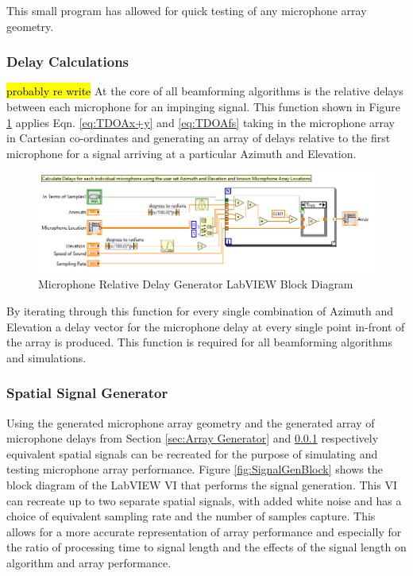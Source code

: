 \documentclass{UoNMCHA}
\numberwithin{equation}{section}
\begin{document}
    This small program has allowed for quick testing of any microphone array geometry.
\subsubsection{Delay Calculations} \label{sec:Delay Calculations}
    \hl{probably re write}
    At the core of all beamforming algorithms is the relative delays between each microphone for an impinging signal. This function shown in Figure \ref{fig:MicDelayBlock} applies Eqn. \ref{eq:TDOAx+y} and \ref{eq:TDOAfs} taking in the microphone array in Cartesian co-ordinates and generating an array of delays relative to the first microphone for a signal arriving at a particular Azimuth and Elevation.
    
    \begin{figure}[H]
        \centering
        \includegraphics[keepaspectratio, width = \textwidth]{Figures/DelayCalcBlock.png}
        \caption{Microphone Relative Delay Generator LabVIEW Block Diagram}
        \label{fig:MicDelayBlock}
    \end{figure}    
    
    By iterating through this function for every single combination of Azimuth and Elevation a delay vector for the microphone delay at every single point in-front of the array is produced. This function is required for all beamforming algorithms and simulations.
    
\subsubsection{Spatial Signal Generator} \label{sec:Signal Generator}
    Using the generated microphone array geometry and the generated array of microphone delays from Section \ref{sec:Array Generator} and \ref{sec:Delay Calculations} respectively equivalent spatial signals can be recreated for the purpose of simulating and testing microphone array performance. Figure \ref{fig:SignalGenBlock} shows the block diagram of the LabVIEW VI that performs the signal generation. This VI can recreate up to two separate spatial signals, with added white noise and has a choice of equivalent sampling rate and the number of samples capture. This allows for a more accurate representation of array performance and especially for the ratio of processing time to signal length and the effects of the signal length on algorithm and array performance. 
    
\end{document}
